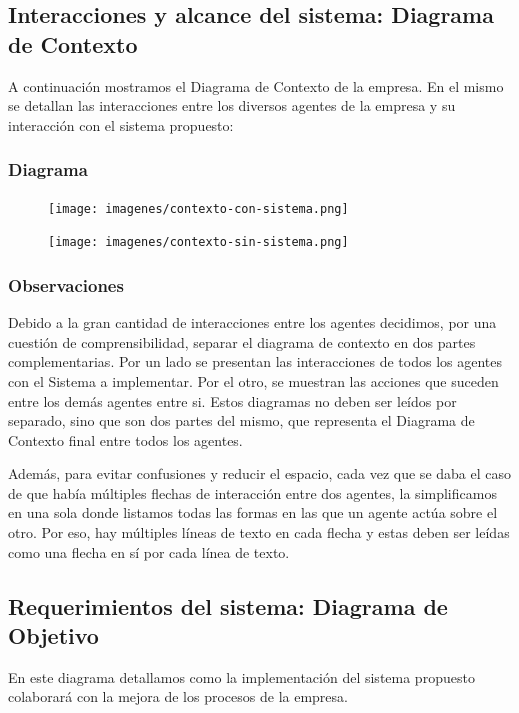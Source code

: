 \subsection{Interacciones y alcance del sistema: Diagrama de Contexto}
A continuación mostramos el Diagrama de Contexto de la empresa. En el mismo se detallan las interacciones entre los diversos agentes de la empresa y su interacción con el sistema propuesto:

\subsubsection{Diagrama}

\begin{figure}[H]
    \centering
    \texttt{[image: imagenes/contexto-con-sistema.png]}
\end{figure}

\begin{figure}[H]
    \centering
    \texttt{[image: imagenes/contexto-sin-sistema.png]}
\end{figure}

\newpage

\subsubsection{Observaciones}

Debido a la gran cantidad de interacciones entre los agentes decidimos, por una cuestión de comprensibilidad, separar el diagrama de contexto en dos partes complementarias. Por un lado se presentan las interacciones de todos los agentes con el Sistema a implementar. Por el otro, se muestran las acciones que suceden entre los demás agentes entre si. Estos diagramas no deben ser leídos por separado, sino que son dos partes del mismo, que representa el Diagrama de Contexto final entre todos los agentes.

Además, para evitar confusiones y reducir el espacio, cada vez que se daba el caso de que había múltiples flechas de interacción entre dos agentes, la simplificamos en una sola donde listamos todas las formas en las que un agente actúa sobre el otro. Por eso, hay múltiples líneas de texto en cada flecha y estas deben ser leídas como una flecha en sí por cada línea de texto.

\subsection{Requerimientos del sistema: Diagrama de Objetivo}
En este diagrama detallamos como la implementación del sistema propuesto colaborará con la mejora de los procesos de la empresa.

